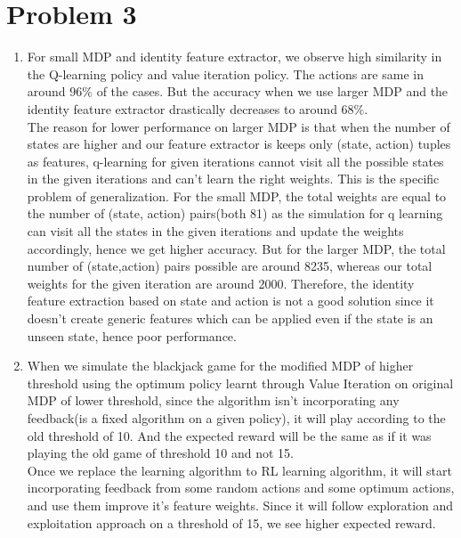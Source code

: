 \documentclass[12pt]{article}
\begin{document}
\section*{Problem 3}

\begin{enumerate}[label=(\alph*)]
	\addtocounter{enumi}{1}
	\item For small MDP and identity feature extractor, we observe high similarity in the Q-learning policy and value iteration policy. The actions are same in around $96\%$ of the cases.  But the accuracy when we use larger MDP and the identity feature extractor drastically decreases to around $68\%$. \\
	The reason for lower performance on larger MDP is that when the number of states are higher and our feature extractor is keeps only (state, action) tuples as features, q-learning for given iterations cannot visit all the possible states in the given iterations and can't learn the right weights. This is the specific problem of generalization. For the small MDP, the total weights are equal to the number of (state, action) pairs(both 81) as the simulation for q learning can visit all the states in the given iterations and update the weights accordingly, hence we get higher accuracy. But for the larger MDP, the total number of (state,action) pairs possible are around 8235, whereas our total weights for the given iteration are around 2000. Therefore, the identity feature extraction based on state and action is not a good solution since it doesn't create generic features which can be applied even if the state is an unseen state, hence poor performance.
	\addtocounter{enumi}{1}
	\item When we simulate the blackjack game for the modified MDP of higher threshold using the optimum policy learnt through Value Iteration on original MDP of lower threshold, since the algorithm isn't incorporating any feedback(is a fixed algorithm on a given policy), it will play according to the old threshold of 10. And the expected reward will be the same as if it was playing the old game of threshold 10 and not 15. \\
	Once we replace the learning algorithm to RL learning algorithm, it will start incorporating feedback from some random actions and some optimum actions, and use them improve it's feature weights. Since it will follow exploration and exploitation approach on a threshold of 15, we see higher expected reward.
\end{enumerate}
\end{document}
